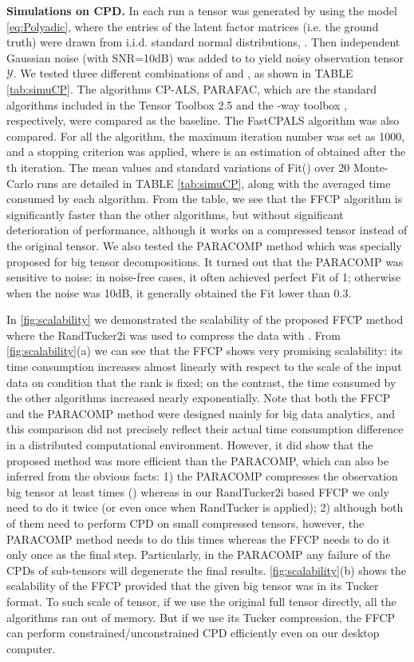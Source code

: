 \documentclass[10pt,twocolumn,twoside]{IEEEtran}
\newcommand{\tensor}[1]{\ensuremath{\boldsymbol{\mathscr{#1}}}}
\begin{document}
{\bf Simulations on CPD.} In each run a tensor  was generated by using the model \eqref{eq:Polyadic}, where the entries of the latent factor matrices  (i.e. the ground truth) were drawn from i.i.d. standard normal distributions, . Then independent Gaussian noise (with SNR=10dB) was added to  to yield noisy observation tensor \tensor{Y}.  We tested three different combinations of  and , as shown in TABLE \ref{tab:simuCP}. The algorithms CP-ALS, PARAFAC, which are the standard algorithms included in the Tensor Toolbox 2.5 \cite{KoldaTensorToolbox} and the -way toolbox \cite{nwaytoolbox}, respectively, were compared as the baseline. The FastCPALS algorithm  \cite{PhanCPgrad} was also compared. For all the algorithm, the maximum iteration number was set as 1000, and a stopping criterion  was applied, where   is an estimation of  obtained after the th iteration. The mean values and standard variations of Fit() over 20 Monte-Carlo runs are detailed in TABLE \ref{tab:simuCP}, along with the averaged time consumed by each algorithm. From the table, we see that the FFCP algorithm is significantly faster than the other algorithms, but without  significant deterioration of performance, although it works on a compressed tensor instead of the original tensor.  We also tested the PARACOMP \cite{paracomp} method which was specially proposed for big tensor decompositions. It turned out that the PARACOMP was sensitive to noise: in noise-free cases, it often achieved perfect Fit of 1; otherwise when the noise was 10dB, it generally obtained the Fit lower than 0.3.

In \figurename \ref{fig:scalability} we demonstrated the scalability of the proposed FFCP method where the RandTucker2i was used to compress the data with . From \figurename \ref{fig:scalability}(a) we can see  that the FFCP shows very promising scalability: its time consumption  increases almost linearly with respect to the scale of the input data on condition that the rank is fixed; on the contrast, the time consumed by the other algorithms increased nearly exponentially. Note that both the FFCP and the PARACOMP method \cite{paracomp} were designed mainly for big data analytics, and this comparison did not precisely reflect their actual time consumption difference in a distributed computational environment. However, it did show that the proposed method was more efficient than the PARACOMP, which can also be inferred from the obvious facts: 1) the PARACOMP compresses the observation big tensor at least  times () whereas in our RandTucker2i based FFCP we only need to do it twice (or even once when RandTucker is applied); 2) although both of them need to perform CPD on small compressed tensors, however, the PARACOMP method needs to do this  times whereas the FFCP needs to do it only once as the final step. Particularly, in the PARACOMP any failure of the CPDs of  sub-tensors will degenerate the final results. \figurename \ref{fig:scalability}(b) shows the scalability of the FFCP provided that the given big tensor was in its Tucker format. To such scale of tensor, if we use the original full tensor directly, all the algorithms ran out of memory. But if we use its Tucker compression, the FFCP can perform  constrained/unconstrained CPD efficiently even on our desktop computer.
\end{document}

